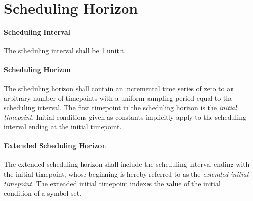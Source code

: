 \section{Scheduling Horizon}

\paragraph{Scheduling Interval}
The scheduling interval shall be 1 \gls{unit:t}.

\paragraph{Scheduling Horizon}
The scheduling horizon shall contain an incremental time series of zero to an
arbitrary number of timepoints with a uniform sampling period equal to the
scheduling interval. The first timepoint in the scheduling horizon is the
\emph{initial timepoint}. Initial conditions given as constants implicitly apply
to the scheduling interval ending at the initial timepoint.

\paragraph{Extended Scheduling Horizon}
The extended scheduling horizon shall include the scheduling interval ending
with the initial timepoint, whose beginning is hereby referred to as the
\emph{extended initial timepoint}. The extended initial timepoint indexes the
value of the initial condition of a symbol set.
